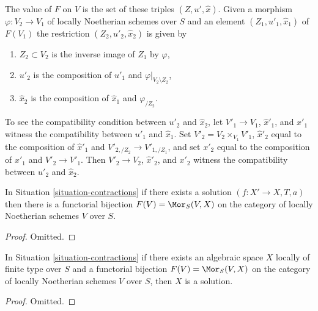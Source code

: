\medskip\noindent
The value of $F$ on $V$ is the set of these triples $(Z, u', \hat x)$.
Given a morphism $\varphi : V_2 \to V_1$ of locally
Noetherian schemes over $S$ and an element $(Z_1, u'_1, \hat x_1)$
of $F(V_1)$ the restriction $(Z_2, u'_2, \hat x_2)$ is given by
\begin{enumerate}
\item $Z_2 \subset V_2$ is the inverse image of $Z_1$ by $\varphi$,
\item $u'_2$ is the composition of $u'_1$ and $\varphi|_{V_2 \setminus Z_2}$,
\item $\hat x_2$ is the composition of $\hat x_1$ and $\varphi_{/Z_2}$.
\end{enumerate}
To see the compatibility condition between $u'_2$ and $\hat x_2$, let
$V'_1 \to V_1$, $\hat x'_1$, and $x'_1$ witness the compatibility between
$u'_1$ and $\hat x_1$. Set $V'_2 = V_2 \times_{V_1} V'_1$,
$\hat x'_2$ equal to the composition of $\hat x'_1$ and
$V'_{2, /Z_2} \to V'_{1, /Z_1}$, and set $x'_2$
equal to the composition of $x'_1$ and $V'_2 \to V'_1$.
Then $V'_2 \to V_2$, $\hat x'_2$, and $x'_2$ witness the compatibility between
$u'_2$ and $\hat x_2$.

\begin{lemma}
\label{lemma-solution}
In Situation \ref{situation-contractions} if there exists a solution
$(f : X' \to X, T, a)$ then there is a functorial bijection
$F(V) = \Mor_S(V, X)$ on the category of
locally Noetherian schemes $V$ over $S$.
\end{lemma}

\begin{proof}
Omitted.
\end{proof}

\begin{lemma}
\label{lemma-functor-is-solution}
In Situation \ref{situation-contractions} if there exists an
algebraic space $X$ locally of finite type over $S$ and a
functorial bijection $F(V) = \Mor_S(V, X)$ on the category of
locally Noetherian schemes $V$ over $S$, then $X$ is a solution.
\end{lemma}

\begin{proof}
Omitted.
\end{proof}

